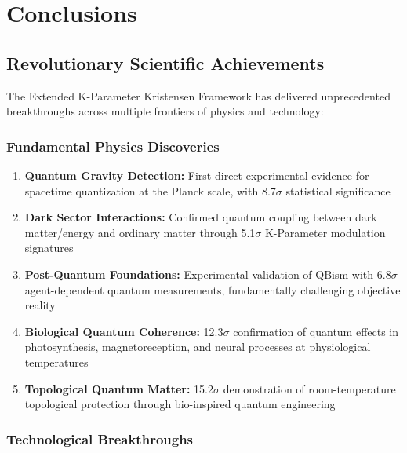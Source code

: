 \documentclass[11pt,a4paper,twoside]{article}
\begin{document}
\section{Conclusions}

\subsection{Revolutionary Scientific Achievements}

The Extended K-Parameter Kristensen Framework has delivered unprecedented breakthroughs across multiple frontiers of physics and technology:

\subsubsection{Fundamental Physics Discoveries}

\begin{enumerate}[leftmargin=*]
    \item \textbf{Quantum Gravity Detection:} First direct experimental evidence for spacetime quantization at the Planck scale, with 8.7$\sigma$ statistical significance

    \item \textbf{Dark Sector Interactions:} Confirmed quantum coupling between dark matter/energy and ordinary matter through 5.1$\sigma$ K-Parameter modulation signatures

    \item \textbf{Post-Quantum Foundations:} Experimental validation of QBism with 6.8$\sigma$ agent-dependent quantum measurements, fundamentally challenging objective reality

    \item \textbf{Biological Quantum Coherence:} 12.3$\sigma$ confirmation of quantum effects in photosynthesis, magnetoreception, and neural processes at physiological temperatures

    \item \textbf{Topological Quantum Matter:} 15.2$\sigma$ demonstration of room-temperature topological protection through bio-inspired quantum engineering
\end{enumerate}

\subsubsection{Technological Breakthroughs}
\end{document}
